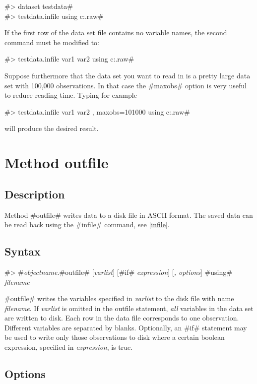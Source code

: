 #> dataset testdata# \\
#> testdata.infile using c:\data\testdata.raw#

If the first row of the data set file contains no variable names,
the second command must be modified to:

#> testdata.infile var1 var2 using c:\data\testdata.raw#

Suppose furthermore that the data set you want to read in is a
pretty large data set with 100,000
observations. In that case the #maxobs# option is very useful to reduce reading time.  Typing for example

#> testdata.infile var1 var2 , maxobs=101000 using c:\data\testdata.raw#

will produce the desired result.


\section{Method outfile}
\label{outfile}   

\subsection*{Description}

Method #outfile# writes data to a disk file in ASCII format. The saved
data can be read back using the #infile# command, see
\autoref{infile}.



\subsection*{Syntax}

#> #{\em objectname}.#outfile# [{\em varlist}] [#if# {\em expression}] [{\em , options}] #using# {\em filename}

#outfile# writes the variables specified in {\em varlist} to the
disk file with name {\em filename}. If {\em varlist} is omitted in
the outfile statement, {\em all} variables in the data set are
written to disk. Each row in the data file corresponds to one
observation. Different variables are separated by blanks.
Optionally, an #if# statement may be used to write only those
observations to disk where a certain boolean expression, specified
in {\em expression}, is true.


\subsection*{Options}


